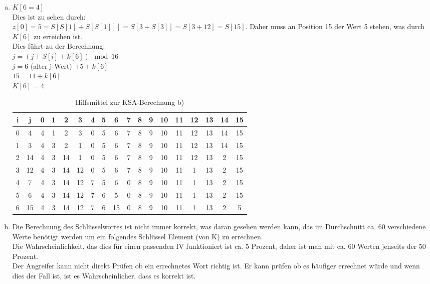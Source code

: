 \documentclass[12pt.twoside,a4paper,notitlepage]{article}
\begin{document}
\begin{enumerate}[a)]
\item $K[6=4]$\\
Dies ist zu sehen durch: \\
$z[0]=5=S[S[1]+S[S[1]]]=S[3+S[3]]=S[3+12]=S[15]$. Daher muss an Position 15 der Wert 5 stehen, was durch $K[6]$ zu 
erreichen ist.\\
Dies führt zu der Berechnung: \\
$j = (j + S[i] + k[6]) \mod 16 $\\
$j = 6 $ (alter j Wert) $+ 5 + k[6]$ \\
$15 = 11 + k[6]$\\
$K[6] = 4 $
\begin{table}[h]
\centering
\begin{tabular}{|c|c||c|c|c|c|c|c|c|c|c|c|c|c|c|c|c|c|}
\hline
i & j & 0 & 1 & 2 & 3 & 4 & 5 & 6 & 7 & 8 & 9 & 10 & 11 & 12 & 13 & 14 & 15 \\
\hline
0 & 4 & 4 & 1 & 2 & 3 & 0 & 5 & 6 & 7 & 8 & 9 & 10 & 11 & 12 & 13 & 14 & 15 \\
\hline
1 & 3 & 4 & 3 & 2 & 1 & 0 & 5 & 6 & 7 & 8 & 9 & 10 & 11 & 12 & 13 & 14 & 15 \\
\hline
2 & 14 & 4 & 3 & 14 & 1 & 0 & 5 & 6 & 7 & 8 & 9 & 10 & 11 & 12 & 13 & 2 & 15 \\
\hline
3 & 12 & 4 & 3 & 14 & 12 & 0 & 5 & 6 & 7 & 8 & 9 & 10 & 11 & 1 & 13 & 2 & 15 \\
\hline
4 & 7 & 4 & 3 & 14 & 12 & 7 & 5 & 6 & 0 & 8 & 9 & 10 & 11 & 1 & 13 & 2 & 15 \\
\hline
5 & 6 & 4 & 3 & 14 & 12 & 7 & 6 & 5 & 0 & 8 & 9 & 10 & 11 & 1 & 13 & 2 & 15 \\
\hline
6 & 15 & 4 & 3 & 14 & 12 & 7 & 6 & 15 & 0 & 8 & 9 & 10 & 11 & 1 & 13 & 2 & 5 \\
\hline
\end{tabular}
\caption{Hilfsmittel zur KSA-Berechnung b)}
\label{tab:ksb}
\end{table}

\item %

Die Berechnung des Schlüsselwortes ist nicht immer korrekt, was daran gesehen werden kann, das im Durchschnitt ca. 60
verschiedene Werte benötigt werden um ein folgendes Schlüssel Element (von K) zu errechnen.\\
Die Wahrscheinlichkeit, das dies für einen passenden IV funktioniert ist ca. 5 Prozent, daher ist man mit ca. 60 Werten jenseits der 50 Prozent.\\
Der Angreifer kann nicht direkt Prüfen ob ein errechnetes Wort richtig ist. Er kann prüfen ob es häufiger errechnet würde und wenn dies der Fall ist, ist es Wahrscheinlicher, dass es korrekt ist.

\end{enumerate}
\end{document}

